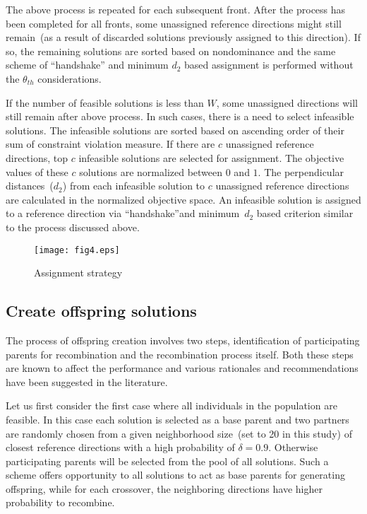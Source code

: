 The above process is repeated for each subsequent front. After the process has been completed for all fronts, some unassigned reference directions might still remain~(as a result of discarded solutions previously assigned to this direction). If so, the remaining solutions are sorted based on nondominance and the same scheme of ``handshake'' and minimum $d_2$ based assignment is performed without the $\theta_{th}$ considerations.

If the number of feasible solutions is less than $W$, some unassigned directions will still remain after above process. In such cases, there is a need to select infeasible solutions. The infeasible solutions are sorted based on ascending order of their sum of constraint violation measure. If there are $c$ unassigned reference directions, top $c$ infeasible solutions are selected for assignment. The objective values of these $c$ solutions are normalized between $0$ and $1$. The perpendicular distances~($d_2$) from each infeasible solution to $c$ unassigned reference directions are calculated in the normalized objective space. An infeasible solution is assigned to a reference direction via ``handshake''and minimum~$d_2$ based criterion similar to the process discussed above.

\begin{figure}[!htb]
	\centering
	\texttt{[image: fig4.eps]}
	\caption{Assignment strategy}
	\label{fig:assignmentnd}
\end{figure}

\subsection{Create offspring solutions}
\label{subsec:create} 

The process of offspring creation involves two steps, identification of participating parents for recombination and the recombination process itself. Both these steps are known to affect the performance and various rationales and recommendations have been suggested in the literature. 

Let us first consider the first case where all individuals in the population are feasible. In this case each solution is selected as a base parent and two partners are randomly chosen from a given neighborhood size~(set to 20 in this study) of closest reference directions with a high probability of $\delta = 0.9$. Otherwise participating parents will be selected from the pool of all solutions. Such a scheme offers opportunity to all solutions to act as base parents for generating offspring, while for each crossover, the neighboring directions have higher probability to recombine.


